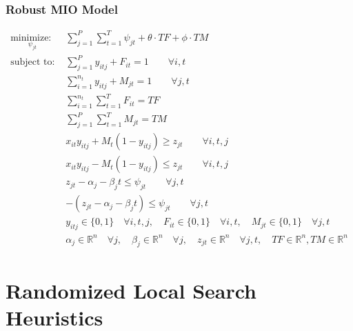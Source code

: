 \documentclass{beamer}
\begin{document}
\begin{frame}[shrink=20]
\frametitle{Robust MIO Model}
\begin{align*}
\underset{\psi_{jt}}{\text{minimize: }} & \sum_{j=1}^{P} \sum_{t=1}^{T} \psi_{jt} + \theta \cdot TF + \phi \cdot TM \\
\text{subject to: }	& \sum_{j=1}^{P} y_{itj} + F_{it} = 1 \qquad \forall i,t \nonumber \\
				& \sum_{i=1}^{n_{t}} y_{itj} + M_{jt} = 1 \qquad \forall j,t \nonumber\\
				& \sum_{i=1}^{n_{t}} \sum_{t=1}^{T} F_{it} = TF \nonumber \\
				& \sum_{j=1}^{P} \sum_{t=1}^{T} M_{jt} = TM \nonumber \\
				& x_{it}y_{itj} + M_{t}(1-y_{itj}) \geq z_{jt} \qquad \forall i,t,j \nonumber \\
				& x_{it}y_{itj} - M_{t}(1-y_{itj}) \leq z_{jt} \qquad \forall i,t,j \nonumber \\
				& z_{jt} - \alpha_{j} - \beta_{j}t \leq \psi_{jt} \qquad \forall j,t \nonumber \\
				& -(z_{jt} - \alpha_{j} - \beta_{j}t) \leq \psi_{jt} \qquad \forall j,t \nonumber \\
			 	& y_{itj} \in \{0,1\} \quad \forall i,t,j,\quad F_{it} \in \{0,1\} \quad \forall i,t,\quad M_{jt} \in \{0,1\} \quad \forall j,t\\
				& \alpha_{j} \in \mathbb{R}^n \quad \forall j,\quad \beta_{j} \in \mathbb{R}^n \quad \forall j, \quad z_{jt} \in \mathbb{R}^n \quad \forall j,t,\quad TF \in \mathbb{R}^n,TM \in \mathbb{R}^n\end{align*}
\end{frame}

\section{Randomized Local Search Heuristics}

\end{document}
